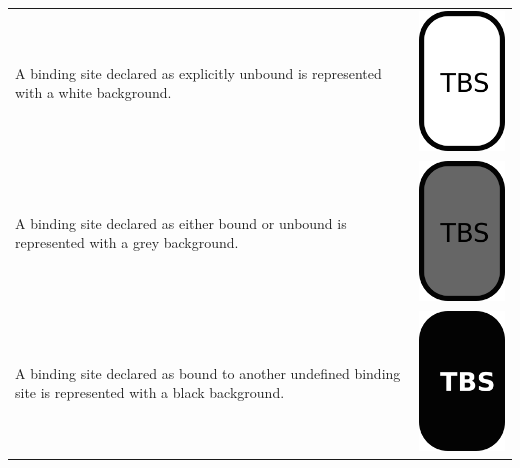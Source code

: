 \begin{tabular}{m{} m{}}
 A binding site declared as explicitly unbound is represented with a white background.& \includegraphics{figs/pngs/unbound.png} \\
 A binding site declared as either bound or unbound is represented with a grey background.& \includegraphics{figs/pngs/dunno.png} \\
 A binding site declared as bound to another undefined binding site is represented with a black background. & \includegraphics{figs/pngs/generic.png} \\

\end{tabular}
